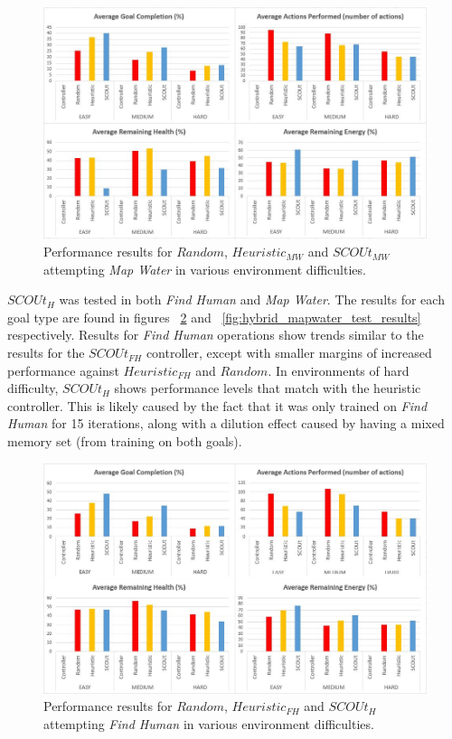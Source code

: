 \begin{figure}[H]
  \includegraphics[width=1.0\columnwidth]{Figures/Results/Experiment1/MapWater.JPG}
  \caption{Performance results for $Random$, $Heuristic_{MW}$ and $SCOUt_{MW}$ attempting \textit{Map Water} in various environment difficulties.}
  \label{fig:mapwater_test_results}
\end{figure}


$SCOUt_{H}$ was tested in both \textit{Find Human} and \textit{Map Water}.
The results for each goal type are found in figures ~\ref{fig:hybrid_findhuman_test_results} and ~\ref{fig:hybrid_mapwater_test_results} respectively.
Results for \textit{Find Human} operations show trends similar to the results for the $SCOUt_{FH}$ controller, except with smaller margins of increased performance against $Heuristic_{FH}$ and $Random$.
In environments of hard difficulty, $SCOUt_{H}$ shows performance levels that match with the heuristic controller.
This is likely caused by the fact that it was only trained on \textit{Find Human} for 15 iterations, along with a dilution effect caused by having a mixed memory set (from training on both goals).

\begin{figure}[H]
  \includegraphics[width=1.0\columnwidth]{Figures/Results/Experiment1/HybridFindHuman.JPG}
  \caption{Performance results for $Random$, $Heuristic_{FH}$ and $SCOUt_{H}$ attempting \textit{Find Human} in various environment difficulties.}
  \label{fig:hybrid_findhuman_test_results}
\end{figure}

